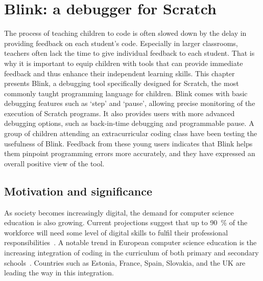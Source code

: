 \documentclass[../main]{subfiles}
\begin{document}
\chapter{Blink: a debugger for Scratch}\label{ch:blink}


The process of teaching children to code is often slowed down by the delay in providing feedback on each student's code.
Especially in larger classrooms, teachers often lack the time to give individual feedback to each student.
That is why it is important to equip children with tools that can provide immediate feedback and thus enhance their independent learning skills.
This chapter presents Blink, a debugging tool specifically designed for Scratch, the most commonly taught programming language for children.
Blink comes with basic debugging features such as `step' and `pause', allowing precise monitoring of the execution of Scratch programs.
It also provides users with more advanced debugging options, such as back-in-time debugging and programmable pause.
A group of children attending an extracurricular coding class have been testing the usefulness of Blink.
Feedback from these young users indicates that Blink helps them pinpoint programming errors more accurately, and they have expressed an overall positive view of the tool.

\section{Motivation and significance}\label{sec:blink-motivation}

As society becomes increasingly digital, the demand for computer science education is also growing.
Current projections suggest that up to \qty{90}{\percent} of the workforce will need some level of digital skills to fulfil their professional responsibilities~\autocite{bejakovicImportanceDigitalLiteracy2020a}.
A notable trend in European computer science education is the increasing integration of coding in the curriculum of both primary and secondary schools~\autocite{balanskatComputingOurFuture2015a}.
Countries such as Estonia, France, Spain, Slovakia, and the UK are leading the way in this integration.
\end{document}
